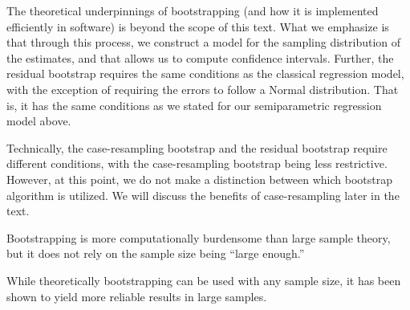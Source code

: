\documentclass[
  letterpaper,
  DIV=11,
  numbers=noendperiod]{scrreprt}
\theoremstyle{definition}
\theoremstyle{definition}
\theoremstyle{remark}
\begin{document}
The theoretical underpinnings of bootstrapping (and how it is
implemented efficiently in software) is beyond the scope of this text.
What we emphasize is that through this process, we construct a model for
the sampling distribution of the estimates, and that allows us to
compute confidence intervals. Further, the residual bootstrap requires
the same conditions as the classical regression model, with the
exception of requiring the errors to follow a Normal distribution. That
is, it has the same conditions as we stated for our semiparametric
regression model above.

\begin{tcolorbox}[enhanced jigsaw, bottomrule=.15mm, titlerule=0mm, bottomtitle=1mm, colback=white, coltitle=black, rightrule=.15mm, leftrule=.75mm, toprule=.15mm, toptitle=1mm, left=2mm, opacityback=0, colframe=quarto-callout-note-color-frame, breakable, title=\textcolor{quarto-callout-note-color}{\faInfo}\hspace{0.5em}{Note}, arc=.35mm, colbacktitle=quarto-callout-note-color!10!white, opacitybacktitle=0.6]

Technically, the case-resampling bootstrap and the residual bootstrap
require different conditions, with the case-resampling bootstrap being
less restrictive. However, at this point, we do not make a distinction
between which bootstrap algorithm is utilized. We will discuss the
benefits of case-resampling later in the text.

\end{tcolorbox}

Bootstrapping is more computationally burdensome than large sample
theory, but it does not rely on the sample size being ``large enough.''

\begin{tcolorbox}[enhanced jigsaw, bottomrule=.15mm, titlerule=0mm, bottomtitle=1mm, colback=white, coltitle=black, rightrule=.15mm, leftrule=.75mm, toprule=.15mm, toptitle=1mm, left=2mm, opacityback=0, colframe=quarto-callout-note-color-frame, breakable, title=\textcolor{quarto-callout-note-color}{\faInfo}\hspace{0.5em}{Note}, arc=.35mm, colbacktitle=quarto-callout-note-color!10!white, opacitybacktitle=0.6]

While theoretically bootstrapping can be used with any sample size, it
has been shown to yield more reliable results in large samples.

\end{tcolorbox}
\end{document}
